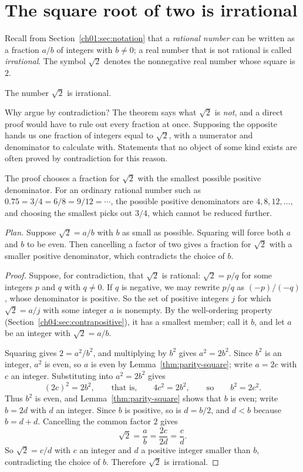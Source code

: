 \section{The square root of two is irrational}\label{ch04:sec:sqrt2}
Recall from Section~\ref{ch01:sec:notation} that a \emph{rational number} can be written as a fraction $a/b$ of integers with $b\ne0$; a real number that is not rational is called \emph{irrational}. The symbol $\sqrt2$ denotes the nonnegative real number whose square is $2$.

\par\noindent\begin{minipage}{\linewidth}
\begin{theorem}\label{thm:sqrt2}
The number $\sqrt2$ is irrational.
\end{theorem}
\end{minipage}\par

Why argue by contradiction? The theorem says what $\sqrt2$ is \emph{not}, and a direct proof would have to rule out every fraction at once. Supposing the opposite hands us one fraction of integers equal to $\sqrt2$, with a numerator and denominator to calculate with. Statements that no object of some kind exists are often proved by contradiction for this reason.

The proof chooses a fraction for $\sqrt2$ with the smallest possible positive denominator. For an ordinary rational number such as $0.75=3/4=6/8=9/12=\cdots$, the possible positive denominators are $4,8,12,\ldots$, and choosing the smallest picks out $3/4$, which cannot be reduced further.

\noindent\textit{Plan.} Suppose $\sqrt2=a/b$ with $b$ as small as possible. Squaring will force both $a$ and $b$ to be even. Then cancelling a factor of two gives a fraction for $\sqrt2$ with a smaller positive denominator, which contradicts the choice of $b$.
\begin{proof}
Suppose, for contradiction, that $\sqrt2$ is rational: $\sqrt2=p/q$ for some integers $p$ and $q$ with $q\ne0$. If $q$ is negative, we may rewrite $p/q$ as $(-p)/(-q)$, whose denominator is positive. So the set of positive integers $j$ for which $\sqrt2=a/j$ with some integer $a$ is nonempty. By the well-ordering property (Section~\ref{ch04:sec:contrapositive}), it has a smallest member; call it $b$, and let $a$ be an integer with $\sqrt2=a/b$.

Squaring gives $2=a^2/b^2$, and multiplying by $b^2$ gives $a^2=2b^2$. Since $b^2$ is an integer, $a^2$ is even, so $a$ is even by Lemma~\ref{thm:parity-square}; write $a=2c$ with $c$ an integer. Substituting into $a^2=2b^2$ gives
\[
(2c)^2=2b^2,\qquad\text{that is,}\qquad 4c^2=2b^2,\qquad\text{so}\qquad b^2=2c^2.
\]
Thus $b^2$ is even, and Lemma~\ref{thm:parity-square} shows that $b$ is even; write $b=2d$ with $d$ an integer. Since $b$ is positive, so is $d=b/2$, and $d<b$ because $b=d+d$. Cancelling the common factor $2$ gives
\[
\sqrt2=\frac{a}{b}=\frac{2c}{2d}=\frac{c}{d}.
\]
So $\sqrt2=c/d$ with $c$ an integer and $d$ a positive integer smaller than $b$, contradicting the choice of $b$. Therefore $\sqrt2$ is irrational.
\end{proof}


